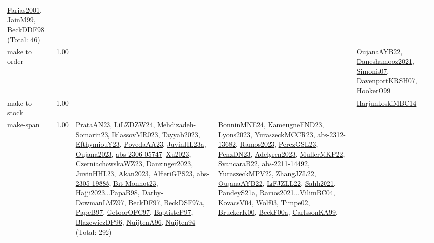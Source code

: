 {\begin{longtable}{p{3cm}r>{\raggedright\arraybackslash}p{6cm}>{\raggedright\arraybackslash}p{6cm}>{\raggedright\arraybackslash}p{8cm}}
\hyperref[detail:Farias2001]{Farias2001}, \hyperref[detail:JainM99]{JainM99}, \hyperref[detail:BeckDDF98]{BeckDDF98} (Total: 46)\\
\index{make to order}\index{Concepts!make to order}make to order &  1.00 &  &  & \hyperref[detail:OujanaAYB22]{OujanaAYB22}, \hyperref[detail:Daneshamooz2021]{Daneshamooz2021}, \hyperref[detail:Simonis07]{Simonis07}, \hyperref[detail:DavenportKRSH07]{DavenportKRSH07}, \hyperref[detail:HookerO99]{HookerO99}\\
\index{make to stock}\index{Concepts!make to stock}make to stock &  1.00 &  &  & \hyperref[detail:HarjunkoskiMBC14]{HarjunkoskiMBC14}\\
\index{make-span}\index{Concepts!make-span}make-span &  1.00 & \hyperref[detail:PrataAN23]{PrataAN23}, \hyperref[detail:LiLZDZW24]{LiLZDZW24}, \hyperref[detail:Mehdizadeh-Somarin23]{Mehdizadeh-Somarin23}, \hyperref[detail:IklassovMR023]{IklassovMR023}, \hyperref[detail:Tayyab2023]{Tayyab2023}, \hyperref[detail:EfthymiouY23]{EfthymiouY23}, \hyperref[detail:PovedaAA23]{PovedaAA23}, \hyperref[detail:JuvinHL23a]{JuvinHL23a}, \hyperref[detail:Oujana2023]{Oujana2023}, \hyperref[detail:abs-2306-05747]{abs-2306-05747}, \hyperref[detail:Xu2023]{Xu2023}, \hyperref[detail:CzerniachowskaWZ23]{CzerniachowskaWZ23}, \hyperref[detail:Danzinger2023]{Danzinger2023}, \hyperref[detail:JuvinHHL23]{JuvinHHL23}, \hyperref[detail:Akan2023]{Akan2023}, \hyperref[detail:AlfieriGPS23]{AlfieriGPS23}, \hyperref[detail:abs-2305-19888]{abs-2305-19888}, \hyperref[detail:Bit-Monnot23]{Bit-Monnot23}, \hyperref[detail:Hajji2023]{Hajji2023}...\hyperref[detail:PapaB98]{PapaB98}, \hyperref[detail:Darby-DowmanLMZ97]{Darby-DowmanLMZ97}, \hyperref[detail:BeckDF97]{BeckDF97}, \hyperref[detail:BeckDSF97a]{BeckDSF97a}, \hyperref[detail:PapeB97]{PapeB97}, \hyperref[detail:GetoorOFC97]{GetoorOFC97}, \hyperref[detail:BaptisteP97]{BaptisteP97}, \hyperref[detail:BlazewiczDP96]{BlazewiczDP96}, \hyperref[detail:NuijtenA96]{NuijtenA96}, \hyperref[detail:Nuijten94]{Nuijten94} (Total: 292) & \hyperref[detail:BonninMNE24]{BonninMNE24}, \hyperref[detail:KameugneFND23]{KameugneFND23}, \hyperref[detail:Lyons2023]{Lyons2023}, \hyperref[detail:YuraszeckMCCR23]{YuraszeckMCCR23}, \hyperref[detail:abs-2312-13682]{abs-2312-13682}, \hyperref[detail:Ramos2023]{Ramos2023}, \hyperref[detail:PerezGSL23]{PerezGSL23}, \hyperref[detail:PenzDN23]{PenzDN23}, \hyperref[detail:Adelgren2023]{Adelgren2023}, \hyperref[detail:MullerMKP22]{MullerMKP22}, \hyperref[detail:SvancaraB22]{SvancaraB22}, \hyperref[detail:abs-2211-14492]{abs-2211-14492}, \hyperref[detail:YuraszeckMPV22]{YuraszeckMPV22}, \hyperref[detail:ZhangJZL22]{ZhangJZL22}, \hyperref[detail:OujanaAYB22]{OujanaAYB22}, \hyperref[detail:LiFJZLL22]{LiFJZLL22}, \hyperref[detail:Sahli2021]{Sahli2021}, \hyperref[detail:PandeyS21a]{PandeyS21a}, \hyperref[detail:Ramos2021]{Ramos2021}...\hyperref[detail:VilimBC04]{VilimBC04}, \hyperref[detail:KovacsV04]{KovacsV04}, \hyperref[detail:Wolf03]{Wolf03}, \hyperref[detail:Timpe02]{Timpe02}, \hyperref[detail:BruckerK00]{BruckerK00}, \hyperref[detail:BeckF00a]{BeckF00a}, \hyperref[detail:CarlssonKA99]{CarlssonKA99}, 
\end{longtable}}
